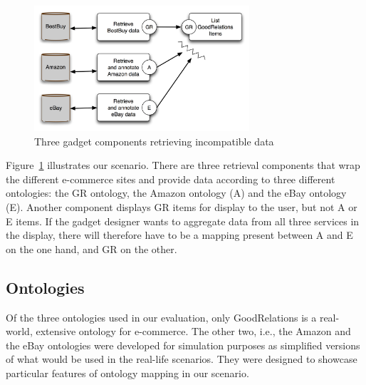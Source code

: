 \begin{figure}
    \centering
        \includegraphics[width=8cm]{images/screens_diagram.png}%
        \caption{Three gadget components retrieving incompatible data}
    \label{fig:screens}
\end{figure}

Figure~\ref{fig:screens} illustrates our scenario. There are three retrieval components that wrap the different e-commerce sites and provide data according to three different ontologies: the GR ontology, the Amazon ontology (A) and the eBay ontology (E). Another component displays GR items for display to the user, but not A or E items. If the gadget designer wants to aggregate data from all three services in the display, there will therefore have to be a mapping present between A and E on the one hand, and GR on the other.



\subsection{Ontologies}
\label{ontologies}
Of the three ontologies used in our evaluation, only GoodRelations is a real-world, extensive ontology for e-commerce. The other two, i.e., the Amazon and the eBay ontologies were developed for simulation purposes as simplified versions of what would be used in the real-life scenarios. They were designed to showcase particular features of ontology mapping in our scenario.

